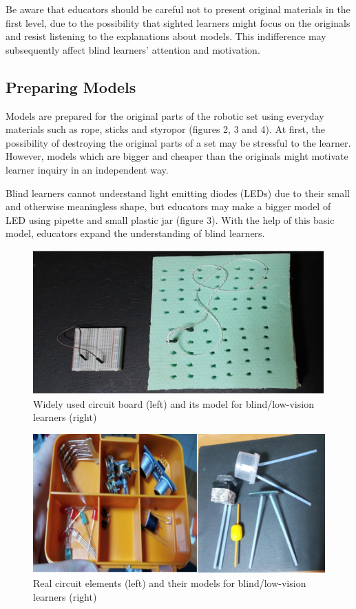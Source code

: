 \documentclass[11.5pt]{sig-alternate} %
\begin{document}
\begin{large}
Be aware that educators should be careful not to present original materials in the first level, due to the possibility that sighted learners might focus on the originals and resist listening to the explanations about models.  This indifference may subsequently affect blind learners’ attention and motivation. 

\subsection*{Preparing Models}

Models are prepared for the original parts of the robotic set using everyday materials such as rope, sticks and styropor (figures 2, 3 and 4). At first, the possibility of destroying the original parts of a set may be stressful to the learner.  However, models which are bigger and cheaper than the originals might motivate learner inquiry in an independent way. 

Blind learners cannot understand light emitting diodes (LEDs) due to their small and otherwise meaningless shape, but educators may make a bigger model of LED using pipette and small plastic jar (figure 3).  With the help of this basic model, educators expand the understanding of blind learners. 
 
\begin{figure}[ht]
     \centering
     \includegraphics[width=1\linewidth]{fig2.png}
     \caption{Widely used circuit board (left) and its model for blind/low-vision learners (right)}
 \end{figure} 

\begin{figure}[ht]
    \centering
    \includegraphics[width=1\linewidth]{fig3.png}
    \caption{Real circuit elements (left) and their models for blind/low-vision learners (right) }
\end{figure}
  

\end{large}
\end{document}
